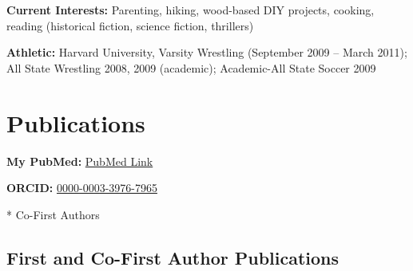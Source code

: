 \documentclass[11pt,letterpaper]{article}
\begin{document}
\textbf{Current Interests:} Parenting, hiking, wood-based DIY projects, cooking, reading (historical fiction, science fiction, thrillers)

\textbf{Athletic:} Harvard University, Varsity Wrestling (September 2009 -- March 2011); All State Wrestling 2008, 2009 (academic); Academic-All State Soccer 2009

\vspace{18pt}

\section{Publications}

\textbf{My PubMed:} \href{https://pubmed.ncbi.nlm.nih.gov/?term=brazeau+nf}{PubMed Link}

\textbf{ORCID:} \href{https://orcid.org/0000-0003-3976-7965}{0000-0003-3976-7965}

* Co-First Authors

\vspace{4pt}

\subsection{First and Co-First Author Publications}
\end{document}
